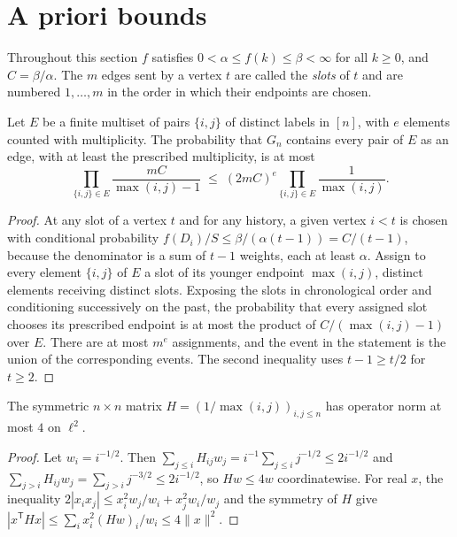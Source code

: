 \section{A priori bounds}\label{sec:apriori}

Throughout this section $f$ satisfies $0<\alpha\le f(k)\le\beta<\infty$ for all $k\ge0$, and $C=\beta/\alpha$.
The $m$ edges sent by a vertex $t$ are called the \emph{slots} of $t$ and are numbered $1,\dots,m$ in the order
in which their endpoints are chosen.

\begin{lemma}\label{lem:edges}
Let $E$ be a finite multiset of pairs $\{i,j\}$ of distinct labels in $[n]$, with $e$ elements counted with
multiplicity. The probability that $G_n$ contains every pair of $E$ as an edge, with at least the prescribed
multiplicity, is at most
\[
   \prod_{\{i,j\}\in E}\frac{mC}{\max(i,j)-1}\;\le\;(2mC)^e\prod_{\{i,j\}\in E}\frac1{\max(i,j)} .
\]
\end{lemma}

\begin{proof}
At any slot of a vertex $t$ and for any history, a given vertex $i<t$ is chosen with conditional probability
$f(D_i)/S\le\beta/(\alpha(t-1))=C/(t-1)$, because the denominator is a sum of $t-1$ weights, each at least $\alpha$.
Assign to every element $\{i,j\}$ of $E$ a slot of its younger endpoint $\max(i,j)$, distinct elements receiving
distinct slots. Exposing the slots in chronological order and conditioning successively on the past, the
probability that every assigned slot chooses its prescribed endpoint is at most the product of $C/(\max(i,j)-1)$
over $E$. There are at most $m^e$ assignments, and the event in the statement is the union of the corresponding
events. The second inequality uses $t-1\ge t/2$ for $t\ge2$.
\end{proof}

\begin{lemma}\label{lem:schur}
The symmetric $n\times n$ matrix $H=(1/\max(i,j))_{i,j\le n}$ has operator norm at most $4$ on $\ell^2$.
\end{lemma}

\begin{proof}
Let $w_i=i^{-1/2}$. Then $\sum_{j\le i}H_{ij}w_j=i^{-1}\sum_{j\le i}j^{-1/2}\le 2i^{-1/2}$ and
$\sum_{j>i}H_{ij}w_j=\sum_{j>i}j^{-3/2}\le 2i^{-1/2}$, so $Hw\le 4w$ coordinatewise. For real $x$, the inequality
$2|x_ix_j|\le x_i^2w_j/w_i+x_j^2w_i/w_j$ and the symmetry of $H$ give
$|x^{\mathsf T}Hx|\le\sum_i x_i^2 (Hw)_i/w_i\le4\|x\|^2$.
\end{proof}

